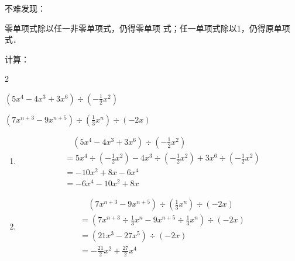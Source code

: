 不难发现：
\begin{blk}{}
    零单项式除以任一非零单项式，仍得零单项
    式；任一单项式除以1，仍得原单项式．
\end{blk}

\begin{example}
  计算：
\begin{enumerate}
    \begin{multicols}{2}
         \item $(5x^4-4x^3+3x^6)\div \left(-\frac{1}{2}x^2\right)$
    \item $(7x^{n+3}-9x^{n+5})\div \left(\frac{1}{3}x^n\right)\div (-2x)$
    \end{multicols}
\end{enumerate}
\end{example}

\begin{solution}
    \begin{enumerate}
        \item \[\begin{split}
            &\quad (5x^4-4x^3+3x^6)\div \left(-\frac{1}{2}x^2\right)\\
            &=  5x^4\div \left(-\frac{1}{2}x^2\right)-4x^3\div \left(-\frac{1}{2}x^2\right)+3x^6 \div \left(-\frac{1}{2}x^2\right)\\
            &=-10x^2+8x-6x^4\\
            &=-6x^4-10x^2+8x   
        \end{split}\]
        \item \[\begin{split}
            &\quad (7x^{n+3}-9x^{n+5})\div \left(\frac{1}{3}x^n\right)\div (-2x)\\
            &=  \left(7x^{n+3} \div\frac{1}{3}x^n-9x^{n+5}\div \frac{1}{3}x^n \right)\div (-2x)\\
            &=(21x^3-27x^5)\div (-2x)\\
            &= -\frac{21}{2}x^2+\frac{27}{2}x^4  
        \end{split}\]
    \end{enumerate}
\end{solution}


